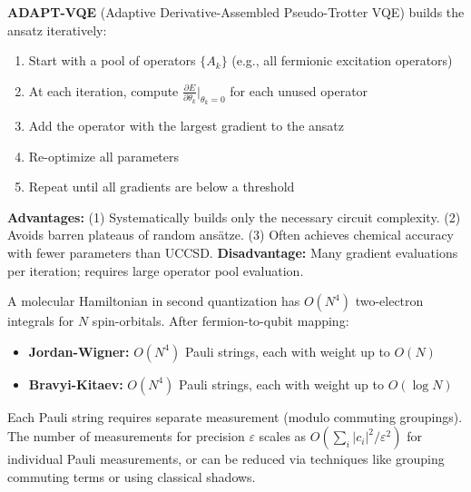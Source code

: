 \documentclass[11pt,a4paper]{article}
\begin{document}
\begin{answerbox}
\textbf{ADAPT-VQE} (Adaptive Derivative-Assembled Pseudo-Trotter VQE) builds the ansatz iteratively:
\begin{enumerate}
    \item Start with a pool of operators $\{A_k\}$ (e.g., all fermionic excitation operators)
    \item At each iteration, compute $\frac{\partial E}{\partial \theta_k}\Big|_{\theta_k=0}$ for each unused operator
    \item Add the operator with the largest gradient to the ansatz
    \item Re-optimize all parameters
    \item Repeat until all gradients are below a threshold
\end{enumerate}
\textbf{Advantages:} (1) Systematically builds only the necessary circuit complexity. (2) Avoids barren plateaus of random ansätze. (3) Often achieves chemical accuracy with fewer parameters than UCCSD. \textbf{Disadvantage:} Many gradient evaluations per iteration; requires large operator pool evaluation.
\end{answerbox}

\begin{answerbox}
A molecular Hamiltonian in second quantization has $O(N^4)$ two-electron integrals for $N$ spin-orbitals. After fermion-to-qubit mapping:
\begin{itemize}
    \item \textbf{Jordan-Wigner:} $O(N^4)$ Pauli strings, each with weight up to $O(N)$
    \item \textbf{Bravyi-Kitaev:} $O(N^4)$ Pauli strings, each with weight up to $O(\log N)$
\end{itemize}
Each Pauli string requires separate measurement (modulo commuting groupings). The number of measurements for precision $\varepsilon$ scales as $O(\sum_i |c_i|^2 / \varepsilon^2)$ for individual Pauli measurements, or can be reduced via techniques like grouping commuting terms or using classical shadows.
\end{answerbox}
\end{document}
